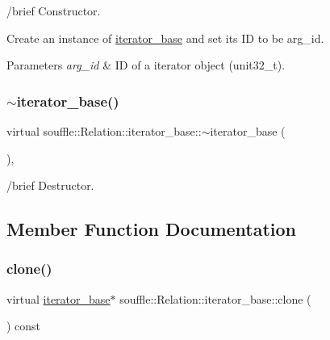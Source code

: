 /brief Constructor.

Create an instance of \hyperlink{classsouffle_1_1_relation_1_1iterator__base}{iterator\+\_\+base} and set its ID to be arg\+\_\+id. 
\begin{DoxyParams}{Parameters}
{\em arg\+\_\+id} & ID of a iterator object (unit32\+\_\+t). \\
\hline
\end{DoxyParams}
\mbox{\label{classsouffle_1_1_relation_1_1iterator__base_a4ddfcc8daa9eaee6d4863a028c0daf0a}} 
\subsubsection{\texorpdfstring{$\sim$iterator\+\_\+base()}{~iterator\_base()}}
{\footnotesize\ttfamily virtual souffle\+::\+Relation\+::iterator\+\_\+base\+::$\sim$iterator\+\_\+base (\begin{DoxyParamCaption}{ }\end{DoxyParamCaption})\hspace{0.3cm}{\ttfamily [virtual]}, {\ttfamily [default]}}

/brief Destructor. 

\subsection{Member Function Documentation}
\mbox{\label{classsouffle_1_1_relation_1_1iterator__base_a1cc6a6f4cc59a83375f6d109b4391737}} 
\subsubsection{\texorpdfstring{clone()}{clone()}}
{\footnotesize\ttfamily virtual \hyperlink{classsouffle_1_1_relation_1_1iterator__base}{iterator\+\_\+base}$\ast$ souffle\+::\+Relation\+::iterator\+\_\+base\+::clone (\begin{DoxyParamCaption}{ }\end{DoxyParamCaption}) const\hspace{0.3cm}{\ttfamily [pure virtual]}}


